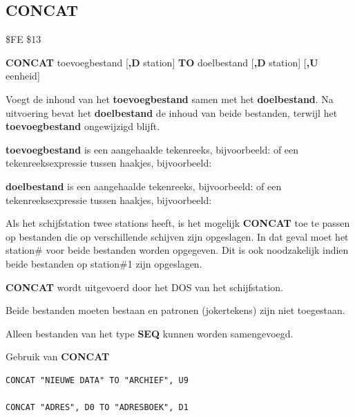 
\newpage
\subsection{CONCAT}
\begin{description}[leftmargin=2cm,style=nextline]
\item [Token:]    \$FE \$13

\item [Formaat:]   {\bf CONCAT} toevoegbestand [{\bf,D} station] {\bf TO} doelbestand [{\bf,D} station] [{\bf,U} eenheid]

\item [Gebruik:]    Voegt de inhoud van het {\bf toevoegbestand} samen met het {\bf doelbestand}. Na uitvoering bevat het {\bf doelbestand} de inhoud van beide bestanden, terwijl het {\bf toevoegbestand} ongewijzigd blijft.

                  {\bf toevoegbestand} is een aangehaalde tekenreeks, bijvoorbeeld:  of een tekenreeksexpressie tussen haakjes, bijvoorbeeld: 

                  {\bf doelbestand} is een aangehaalde tekenreeks, bijvoorbeeld:  of een tekenreeksexpressie tussen haakjes, bijvoorbeeld: 

                  Als het schijfstation twee stations heeft, is het mogelijk {\bf CONCAT} toe te passen op bestanden die op verschillende schijven zijn opgeslagen. In dat geval moet het station\# voor beide bestanden worden opgegeven. Dit is ook noodzakelijk indien beide bestanden op station\#1 zijn opgeslagen.

                  \drivedefinition

                  \unitdefinition

\item [Opmerkingen:]  {\bf CONCAT} wordt uitgevoerd door het DOS van het schijfstation.

Beide bestanden moeten bestaan en patronen (jokertekens) zijn niet toegestaan.

                  Alleen bestanden van het type {\bf SEQ} kunnen worden samengevoegd.

\item [Voorbeelden:] Gebruik van {\bf CONCAT}

\begin{tcolorbox}[colback=black,coltext=white]
\verbatimfont{\codefont}
\begin{verbatim}
CONCAT "NIEUWE DATA" TO "ARCHIEF", U9

CONCAT "ADRES", D0 TO "ADRESBOEK", D1
\end{verbatim}
\end{tcolorbox}
\end{description}

